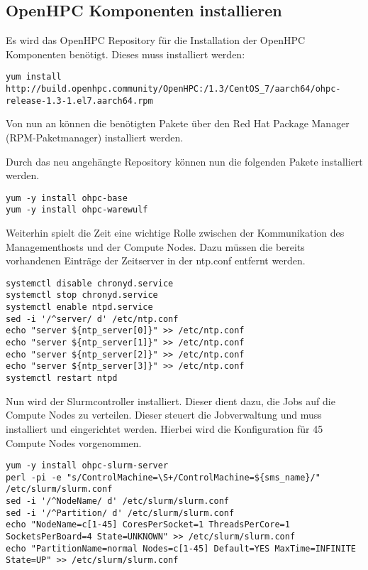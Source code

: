 \subsection{OpenHPC Komponenten installieren}
Es wird das OpenHPC Repository für die Installation der OpenHPC Komponenten benötigt. Dieses muss installiert werden:

\begin{lstlisting}
yum install http://build.openhpc.community/OpenHPC:/1.3/CentOS_7/aarch64/ohpc-release-1.3-1.el7.aarch64.rpm
\end{lstlisting}

Von nun an können die benötigten Pakete über den Red Hat Package Manager (RPM-Paketmanager) installiert werden.

Durch das neu angehängte Repository können nun die folgenden Pakete installiert werden.

\begin{lstlisting}
yum -y install ohpc-base
yum -y install ohpc-warewulf
\end{lstlisting}

Weiterhin spielt die Zeit eine wichtige Rolle zwischen der Kommunikation des Managementhosts und der Compute Nodes. Dazu müssen die bereits vorhandenen Einträge der Zeitserver in der ntp.conf entfernt werden.


\begin{lstlisting}
systemctl disable chronyd.service
systemctl stop chronyd.service
systemctl enable ntpd.service
sed -i '/^server/ d' /etc/ntp.conf
echo "server ${ntp_server[0]}" >> /etc/ntp.conf
echo "server ${ntp_server[1]}" >> /etc/ntp.conf
echo "server ${ntp_server[2]}" >> /etc/ntp.conf
echo "server ${ntp_server[3]}" >> /etc/ntp.conf
systemctl restart ntpd
\end{lstlisting}

Nun wird der Slurmcontroller installiert. Dieser dient dazu, die Jobs auf die Compute Nodes zu verteilen. Dieser steuert die Jobverwaltung und muss installiert und eingerichtet werden. Hierbei wird die Konfiguration für 45 Compute Nodes vorgenommen.

\begin{lstlisting}
yum -y install ohpc-slurm-server
perl -pi -e "s/ControlMachine=\S+/ControlMachine=${sms_name}/" /etc/slurm/slurm.conf
sed -i '/^NodeName/ d' /etc/slurm/slurm.conf
sed -i '/^Partition/ d' /etc/slurm/slurm.conf
echo "NodeName=c[1-45] CoresPerSocket=1 ThreadsPerCore=1 SocketsPerBoard=4 State=UNKNOWN" >> /etc/slurm/slurm.conf
echo "PartitionName=normal Nodes=c[1-45] Default=YES MaxTime=INFINITE State=UP" >> /etc/slurm/slurm.conf
\end{lstlisting}

